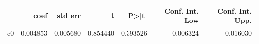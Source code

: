\begin{tabular}{lrrrrrr}
\toprule
 & coef & std err & t & P>|t| & Conf. Int. Low & Conf. Int. Upp. \\
\midrule
c0 & 0.004853 & 0.005680 & 0.854440 & 0.393526 & -0.006324 & 0.016030 \\
\bottomrule
\end{tabular}